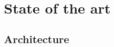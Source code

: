
\chapter{State of the art} %

\label{Chapter3} %


\par 

\section{}

\par 

\par

\section{Architecture}

\par 

\par 

\subsection{}
\par 

\par 

\subsubsection{}

